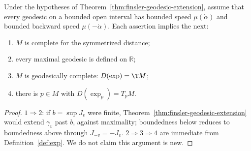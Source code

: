 \begin{theorem}
  \label{thm:finsler-geodesically-complete}
  \leanok
  Under the hypotheses of Theorem~\ref{thm:finsler-geodesic-extension}, assume that every
  geodesic on a bounded open interval has bounded speed $\mu(\dot\alpha)$ and bounded backward
  speed $\mu(-\dot\alpha)$. Each assertion implies the next:
  \begin{enumerate}
    \item $M$ is complete for the symmetrized distance;
    \item every maximal geodesic is defined on $\mathbb{R}$;
    \item $M$ is geodesically complete: $D(\exp) = \T M$;
    \item there is $p \in M$ with $D(\exp_p) = T_pM$.
  \end{enumerate}
\end{theorem}

\begin{proof}
  \leanok
  $1 \Rightarrow 2$: if $b = \sup J_v$ were finite, Theorem~\ref{thm:finsler-geodesic-extension}
  would extend $\gamma_v$ past $b$, against maximality; boundedness below reduces to boundedness
  above through $J_{-v} = -J_v$. $2 \Rightarrow 3 \Rightarrow 4$ are immediate from
  Definition~\ref{def:exp}. We do not claim this argument is new.
\end{proof}

